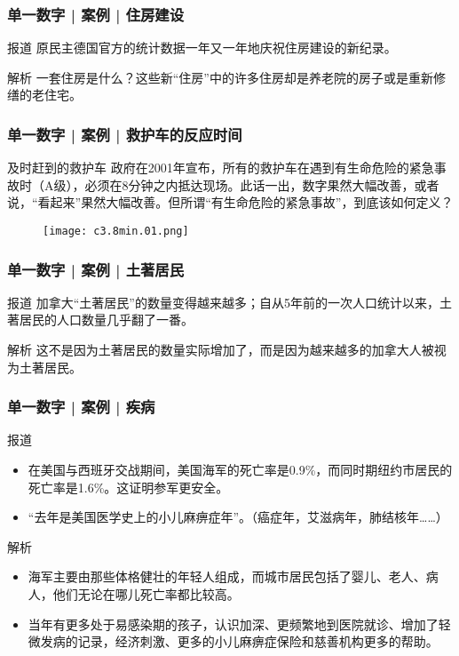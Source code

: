\begin{frame}
  \frametitle{单一数字 | 案例 | 住房建设}
  \begin{block}{报道}
    原民主德国官方的统计数据一年又一年地庆祝住房建设的新纪录。
  \end{block}
  \pause \pause \pause \pause
  \begin{block}{解析}
    一套住房是什么？这些新“住房”中的许多住房却是养老院的房子或是重新修缮的老住宅。
  \end{block}
\end{frame}

\begin{frame}
  \frametitle{单一数字 | 案例 | 救护车的反应时间}
  \begin{block}{及时赶到的救护车}
政府在2001年宣布，所有的救护车在遇到有生命危险的紧急事故时（A级），必须在8分钟之内抵达现场。此话一出，数字果然大幅改善，或者说，“看起来”果然大幅改善。但所谓“有生命危险的紧急事故”，到底该如何定义？
  \end{block}
  \begin{figure}
    \centering
    \texttt{[image: c3.8min.01.png]}
  \end{figure}
\end{frame}

\begin{frame}
  \frametitle{单一数字 | 案例 | 土著居民}
  \begin{block}{报道}
    加拿大“土著居民”的数量变得越来越多；自从5年前的一次人口统计以来，土著居民的人口数量几乎翻了一番。
  \end{block}
  \pause \pause \pause \pause
  \begin{block}{解析}
    这不是因为土著居民的数量实际增加了，而是因为越来越多的加拿大人被视为土著居民。
  \end{block}
\end{frame}

\begin{frame}
  \frametitle{单一数字 | 案例 | 疾病}
  \begin{block}{报道}
    \begin{itemize}
      \item 在美国与西班牙交战期间，美国海军的死亡率是0.9\%，而同时期纽约市居民的死亡率是1.6\%。这证明参军更安全。
      \item “去年是美国医学史上的小儿麻痹症年”。（癌症年，艾滋病年，肺结核年……）
    \end{itemize}
  \end{block}
  \pause \pause \pause \pause
  \begin{block}{解析}
    \begin{itemize}
      \item 海军主要由那些体格健壮的年轻人组成，而城市居民包括了婴儿、老人、病人，他们无论在哪儿死亡率都比较高。
      \item 当年有更多处于易感染期的孩子，认识加深、更频繁地到医院就诊、增加了轻微发病的记录，经济刺激、更多的小儿麻痹症保险和慈善机构更多的帮助。
    \end{itemize}
  \end{block}
\end{frame}

